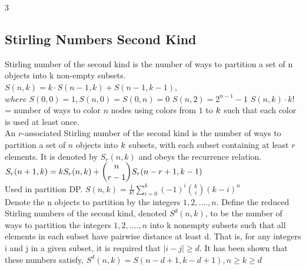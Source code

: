 \begin{multicols*}{3}
\subsection{Stirling Numbers Second Kind}
Stirling number of the second kind is the number of ways to partition a set of n objects into k non-empty subsets. \\
$S(n,k)=k \cdot S(n-1,k)+S(n-1,k-1)$, \(where \; S(0,0)=1,S(n,0)=S(0,n)=0\)
$S(n,2)=2^{n-1}-1$ 
$S(n,k) \cdot k!$ = number of ways to color $n$ nodes using colors from $\displaystyle 1$ to $\displaystyle \displaystyle k$ such that each color is used at least once. \\
An $r$-associated Stirling number of the second kind is the number of ways to partition a set of $n$ objects into $\displaystyle \displaystyle k$ subsets, with each subset containing at least $r$ elements. It is denoted by $S_r( n , k )$ and obeys the recurrence relation. $\displaystyle \displaystyle S_r(n+1,k) = k S_r(n,k) + {n \choose r-1} S_r(n-r+1,k-1)$ \\ 
Used in partition DP. $\displaystyle S(n,k)=\frac{1}{k!}\sum_{i=0}^{k}(-1)^{i}{k \choose i}(k-i)^{n}$ \\
Denote the n objects to partition by the integers $\displaystyle 1, 2, …., n$. Define the reduced Stirling numbers of the second kind, denoted $S^d(n, k)$, to be the number of ways to partition the integers $\displaystyle 1, 2, …., n$ into k nonempty subsets such that all elements in each subset have pairwise distance at least d. That is, for any integers i and j in a given subset, it is required that $|i - j| \geq d$. It has been shown that these numbers satisfy, \(S^d(n, k) = S(n - d + 1, k - d + 1), n \geq k \geq d\)


\end{multicols*}
